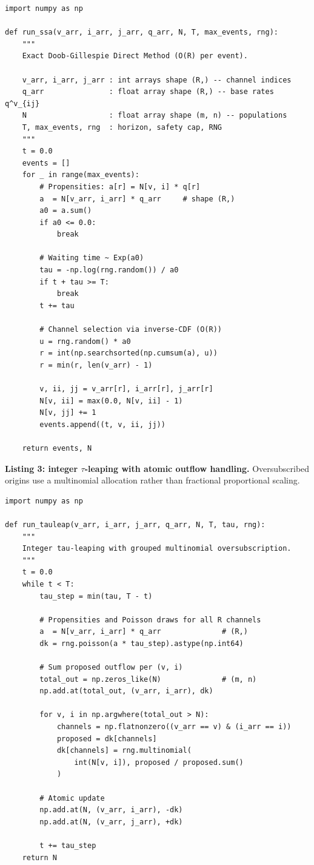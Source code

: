 \documentclass[11pt,a4paper]{article}
\theoremstyle{plain}
\theoremstyle{definition}
\theoremstyle{remark}
\begin{document}
\begin{lstlisting}[caption={Gillespie SSA (\texttt{bkk/simulate.py},
  inner loop).},label={lst:ssa}]
import numpy as np

def run_ssa(v_arr, i_arr, j_arr, q_arr, N, T, max_events, rng):
    """
    Exact Doob-Gillespie Direct Method (O(R) per event).

    v_arr, i_arr, j_arr : int arrays shape (R,) -- channel indices
    q_arr               : float array shape (R,) -- base rates q^v_{ij}
    N                   : float array shape (m, n) -- populations
    T, max_events, rng  : horizon, safety cap, RNG
    """
    t = 0.0
    events = []
    for _ in range(max_events):
        # Propensities: a[r] = N[v, i] * q[r]
        a  = N[v_arr, i_arr] * q_arr     # shape (R,)
        a0 = a.sum()
        if a0 <= 0.0:
            break

        # Waiting time ~ Exp(a0)
        tau = -np.log(rng.random()) / a0
        if t + tau >= T:
            break
        t += tau

        # Channel selection via inverse-CDF (O(R))
        u = rng.random() * a0
        r = int(np.searchsorted(np.cumsum(a), u))
        r = min(r, len(v_arr) - 1)

        v, ii, jj = v_arr[r], i_arr[r], j_arr[r]
        N[v, ii] = max(0.0, N[v, ii] - 1)
        N[v, jj] += 1
        events.append((t, v, ii, jj))

    return events, N
\end{lstlisting}

\textbf{Listing 3: integer $\tau$-leaping with atomic outflow handling.}
Oversubscribed origins use a multinomial allocation rather than fractional
proportional scaling.

\begin{lstlisting}[caption={$\tau$-leaping with atomic outflow clamping
  (\texttt{bkk/simulate.py}).},label={lst:tauleap}]
import numpy as np

def run_tauleap(v_arr, i_arr, j_arr, q_arr, N, T, tau, rng):
    """
    Integer tau-leaping with grouped multinomial oversubscription.
    """
    t = 0.0
    while t < T:
        tau_step = min(tau, T - t)

        # Propensities and Poisson draws for all R channels
        a  = N[v_arr, i_arr] * q_arr              # (R,)
        dk = rng.poisson(a * tau_step).astype(np.int64)

        # Sum proposed outflow per (v, i)
        total_out = np.zeros_like(N)              # (m, n)
        np.add.at(total_out, (v_arr, i_arr), dk)

        for v, i in np.argwhere(total_out > N):
            channels = np.flatnonzero((v_arr == v) & (i_arr == i))
            proposed = dk[channels]
            dk[channels] = rng.multinomial(
                int(N[v, i]), proposed / proposed.sum()
            )

        # Atomic update
        np.add.at(N, (v_arr, i_arr), -dk)
        np.add.at(N, (v_arr, j_arr), +dk)

        t += tau_step
    return N
\end{lstlisting}
\end{document}
